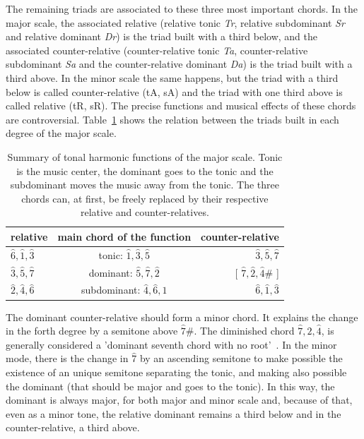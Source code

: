 \documentclass[
 aip,
 jmp,
 amsmath,amssymb,
 reprint,
]{revtex4-1}
\begin{document}
The remaining triads are associated to these three most important chords. In the major scale, the associated relative (relative tonic \textit{Tr}, relative
subdominant \textit{Sr} and relative dominant \textit{Dr}) is the triad built with a
third below, and the associated counter-relative (counter-relative
tonic \textit{Ta}, counter-relative subdominant \textit{Sa} and the
counter-relative dominant \textit{Da}) is the triad built with a third above. In the
minor scale the same happens, but the triad with a third below is called
counter-relative (tA, sA) and the triad with one third above is called relative (tR,
sR). The precise functions and musical effects of these chords are
controversial. Table~\ref{tab:harmonia} shows the relation between the triads
built in each degree of the major scale.

\begin{table}[htpq!]
\centering
\caption{Summary of tonal harmonic functions of the major scale. Tonic is the
music center, the dominant goes to the tonic and the subdominant moves the music away from
the tonic. The three chords can, at first, be freely replaced by their
respective relative and counter-relatives.}
\begin{tabular}{l | c | r}
relative & main chord of the function & counter-relative \\\hline\hline
$\hat{6},\hat{1},\hat{3}$ & tonic:       $\hat{1},\hat{3},\hat{5}$ & $\hat{3}, \hat{5},      \hat{7}$ \\
$\hat{3},\hat{5},\hat{7}$ & dominant:    $\hat{5},\hat{7},\hat{2}$ & [ $\hat{7},\hat{2},\hat{4}\#$ ] \\
$\hat{2},\hat{4},\hat{6}$ & subdominant: $\hat{4},\hat{6},\hat{1}$ & $\hat{6},\hat{1},       \hat{3}$
\end{tabular}
\label{tab:harmonia}
\end{table}

The dominant counter-relative should form a minor chord. It explains the change
in the forth degree by a semitone above $\hat{7}\#$. The diminished chord
$\hat{7},\hat{2},\hat{4}$, is generally considered a 'dominant seventh chord
with no root'~\cite{Koellheuteur}.
In the minor mode, there is the change in $\hat{7}$ by an ascending semitone to
make possible the existence of an unique semitone separating the tonic, and
making also possible the dominant (that should be major and goes to the tonic). In
this way, the dominant is always major, for both major and minor scale and,
because of that, even as a minor tone, the relative dominant remains a third
below and in the counter-relative, a third above.
\end{document}
